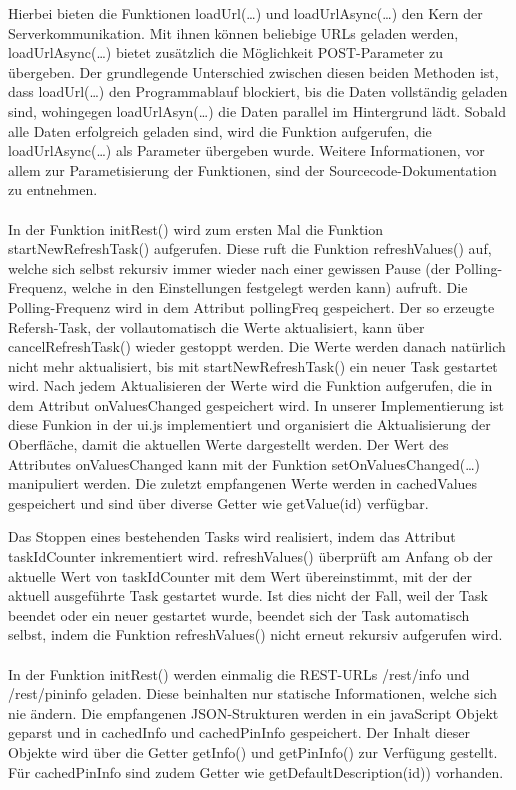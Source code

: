 Hierbei bieten die Funktionen \textrm{loadUrl(\ldots)} und
\textrm{loadUrlAsync(\ldots)} den Kern der Serverkommunikation. Mit ihnen können
beliebige URLs geladen werden, \textrm{loadUrlAsync(\ldots)} bietet zusätzlich
die Möglichkeit POST-Parameter zu übergeben. Der grundlegende Unterschied
zwischen diesen beiden Methoden ist, dass \textrm{loadUrl(\ldots)} den
Programmablauf blockiert, bis die Daten vollständig geladen sind, wohingegen
\textrm{loadUrlAsyn(\ldots)} die Daten parallel im Hintergrund lädt. Sobald alle
Daten erfolgreich geladen sind, wird die Funktion aufgerufen, die
\textrm{loadUrlAsync(\ldots)} als Parameter übergeben wurde. Weitere
Informationen, vor allem zur Parametisierung der Funktionen, sind der
Sourcecode-Dokumentation zu entnehmen.\\
\\
In der Funktion \textrm{initRest()} wird zum ersten Mal die Funktion
\textrm{startNewRefreshTask()} aufgerufen. Diese ruft die Funktion
\textrm{refreshValues()} auf, welche sich selbst rekursiv immer wieder nach
einer gewissen Pause (der Polling-Frequenz, welche in den Einstellungen
festgelegt werden kann) aufruft. Die Polling-Frequenz wird in dem Attribut
\textrm{pollingFreq} gespeichert. Der so erzeugte Refersh-Task, der
vollautomatisch die Werte aktualisiert, kann über \textrm{cancelRefreshTask()}
wieder gestoppt werden. Die Werte werden danach natürlich nicht mehr
aktualisiert, bis mit \textrm{startNewRefreshTask()} ein neuer Task gestartet
wird. Nach jedem Aktualisieren der Werte wird die Funktion aufgerufen, die in
dem Attribut \textrm{onValuesChanged} gespeichert wird. In unserer
Implementierung ist diese Funkion in der \textrm{ui.js} implementiert und
organisiert die Aktualisierung der Oberfläche, damit die aktuellen Werte
dargestellt werden. Der Wert des Attributes \textrm{onValuesChanged} kann mit
der Funktion \textrm{setOnValuesChanged(\ldots)} manipuliert werden. Die zuletzt
empfangenen Werte werden in \textrm{cachedValues} gespeichert und sind über
diverse Getter wie \textrm{getValue(id)} verfügbar.

Das Stoppen eines bestehenden Tasks wird realisiert, indem das Attribut
\textrm{taskIdCounter} inkrementiert wird. \textrm{refreshValues()} überprüft am
Anfang ob der aktuelle Wert von \textrm{taskIdCounter} mit dem Wert
übereinstimmt, mit der der aktuell ausgeführte Task gestartet wurde. Ist dies
nicht der Fall, weil der Task beendet oder ein neuer gestartet wurde, beendet
sich der Task automatisch selbst, indem die Funktion \textrm{refreshValues()}
nicht erneut rekursiv aufgerufen wird.\\
\\
In der Funktion \textrm{initRest()} werden einmalig die REST-URLs
\textrm{/rest/info} und \textrm{/rest/pininfo} geladen. Diese beinhalten nur
statische Informationen, welche sich nie ändern. Die empfangenen JSON-Strukturen
werden in ein javaScript Objekt geparst und in \textrm{cachedInfo} und
\textrm{cachedPinInfo} gespeichert. Der Inhalt dieser Objekte wird über
die Getter \textrm{getInfo()} und \textrm{getPinInfo()} zur Verfügung gestellt.
Für \textrm{cachedPinInfo} sind zudem Getter wie
\textrm{getDefaultDescription(id))} vorhanden.



